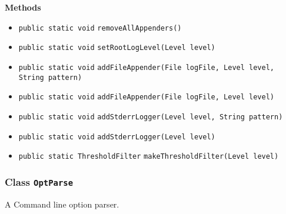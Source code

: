 \textbf{\sffamily Methods}
\begin{itemize}
\item \lstinline|public static void| \lstinline|removeAllAppenders|\lstinline|()| \\[-0.6em]




\item \lstinline|public static void| \lstinline|setRootLogLevel|\lstinline|(Level level)| \\[-0.6em]




\item \lstinline|public static void| \lstinline|addFileAppender|\lstinline|(File logFile, Level level, String pattern)| \\[-0.6em]




\item \lstinline|public static void| \lstinline|addFileAppender|\lstinline|(File logFile, Level level)| \\[-0.6em]




\item \lstinline|public static void| \lstinline|addStderrLogger|\lstinline|(Level level, String pattern)| \\[-0.6em]




\item \lstinline|public static void| \lstinline|addStderrLogger|\lstinline|(Level level)| \\[-0.6em]




\item \lstinline|public static ThresholdFilter| \lstinline|makeThresholdFilter|\lstinline|(Level level)| \\[-0.6em]




\end{itemize}

\subsubsection{Class \lstinline|OptParse|}
A Command line option parser. \\
\noindent\begin{minipage}[t]{5cm}
\vspace{0.3em}
\hspace*{2em}
\vspace{0.3em}
\end{minipage}





